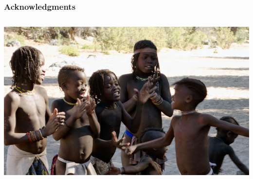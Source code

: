 \documentclass{beamer}
\begin{document}
\begin{frame}
\frametitle{Acknowledgments}

\begin{columns}
\begin{column}{.8\textwidth}
\centering
\includegraphics[width= 1\textwidth]{twekids}
\end{column}


\end{columns}
\end{frame}
\end{document}
